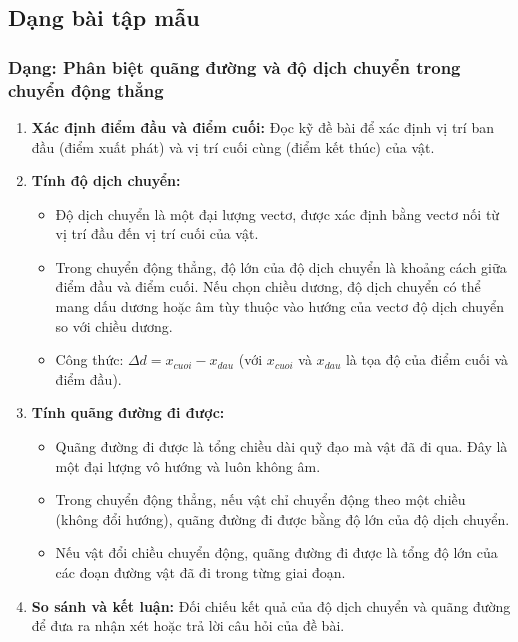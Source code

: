 

\subsection{Dạng bài tập mẫu}
\subsubsection{Dạng: Phân biệt quãng đường và độ dịch chuyển trong chuyển động thẳng}
\begin{phuongphap}
\begin{enumerate}
    \item \textbf{Xác định điểm đầu và điểm cuối:} Đọc kỹ đề bài để xác định vị trí ban đầu (điểm xuất phát) và vị trí cuối cùng (điểm kết thúc) của vật.
    \item \textbf{Tính độ dịch chuyển:}
    \begin{itemize}
        \item Độ dịch chuyển là một đại lượng vectơ, được xác định bằng vectơ nối từ vị trí đầu đến vị trí cuối của vật.
        \item Trong chuyển động thẳng, độ lớn của độ dịch chuyển là khoảng cách giữa điểm đầu và điểm cuối. Nếu chọn chiều dương, độ dịch chuyển có thể mang dấu dương hoặc âm tùy thuộc vào hướng của vectơ độ dịch chuyển so với chiều dương.
        \item Công thức: $\Delta d = x_{cuoi} - x_{dau}$ (với $x_{cuoi}$ và $x_{dau}$ là tọa độ của điểm cuối và điểm đầu).
    \end{itemize}
    \item \textbf{Tính quãng đường đi được:}
    \begin{itemize}
        \item Quãng đường đi được là tổng chiều dài quỹ đạo mà vật đã đi qua. Đây là một đại lượng vô hướng và luôn không âm.
        \item Trong chuyển động thẳng, nếu vật chỉ chuyển động theo một chiều (không đổi hướng), quãng đường đi được bằng độ lớn của độ dịch chuyển.
        \item Nếu vật đổi chiều chuyển động, quãng đường đi được là tổng độ lớn của các đoạn đường vật đã đi trong từng giai đoạn.
    \end{itemize}
    \item \textbf{So sánh và kết luận:} Đối chiếu kết quả của độ dịch chuyển và quãng đường để đưa ra nhận xét hoặc trả lời câu hỏi của đề bài.
\end{enumerate}
\end{phuongphap}
